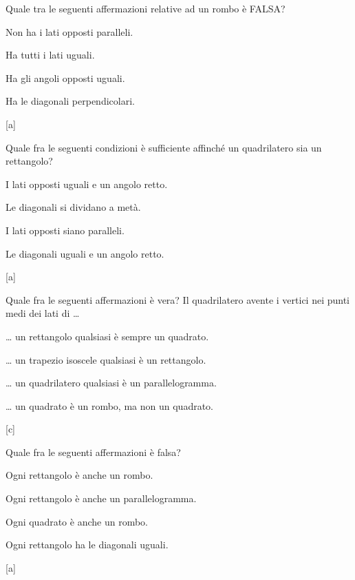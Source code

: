 \begin{esercizio}
\label{ese:4.63}
Quale tra le seguenti affermazioni relative ad un rombo è FALSA?
\begin{multicols}{2}
\begin{enumeratea}
\item Non ha i lati opposti paralleli.
\item Ha tutti i lati uguali.
\item Ha gli angoli opposti uguali.
\item Ha le diagonali perpendicolari.
\end{enumeratea}
\end{multicols}
\hfill[a]
\end{esercizio}

\newpage %

\begin{esercizio}
\label{ese:4.64}
Quale fra le seguenti condizioni è sufficiente affinché un 
quadrilatero sia un rettangolo?
\begin{multicols}{2}
\begin{enumeratea}
\item I lati opposti uguali e un angolo retto.
\item Le diagonali si dividano a metà.
\item I lati opposti siano paralleli.
\item Le diagonali uguali e un angolo retto.
\end{enumeratea}
\end{multicols}
\hfill[a]
\end{esercizio}

\begin{esercizio}
\label{ese:4.65}
Quale fra le seguenti affermazioni è vera?
Il quadrilatero avente i vertici nei punti medi dei lati di \ldots{}
\begin{enumeratea}
\item \ldots{} un rettangolo qualsiasi è sempre un quadrato.
\item \ldots{} un trapezio isoscele qualsiasi è un rettangolo.
\item \ldots{} un quadrilatero qualsiasi è un parallelogramma.
\item \ldots{} un quadrato è un rombo, ma non un quadrato.
\end{enumeratea}
\hfill[c]
\end{esercizio}

\begin{esercizio}
\label{ese:4.66}
Quale fra le seguenti affermazioni è falsa?
\begin{enumeratea}
\item Ogni rettangolo è anche un rombo.
\item Ogni rettangolo è anche un parallelogramma.
\item Ogni quadrato è anche un rombo.
\item Ogni rettangolo ha le diagonali uguali.
\end{enumeratea}
\hfill[a]
\end{esercizio}

